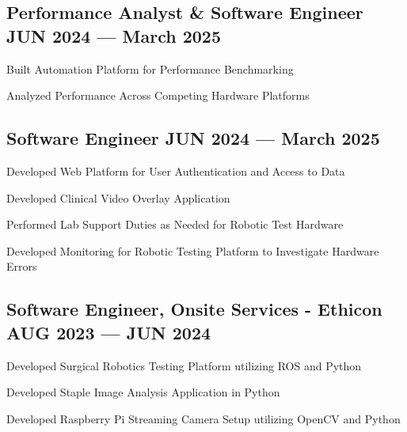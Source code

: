 \subsection{{Performance Analyst & Software Engineer \hfill JUN 2024 --- March 2025}}
\begin{zitemize}
\item Built Automation Platform for Performance Benchmarking
\item Analyzed Performance Across Competing Hardware Platforms
\end{zitemize}

\subsection{{Software Engineer \hfill JUN 2024 --- March 2025}}
\begin{zitemize}
\item Developed Web Platform for User Authentication and Access to Data
\item Developed Clinical Video Overlay Application
\item Performed Lab Support Duties as Needed for Robotic Test Hardware
\item Developed Monitoring for Robotic Testing Platform to Investigate Hardware Errors
\end{zitemize}

\subsection{{Software Engineer, Onsite Services - Ethicon \hfill AUG 2023 --- JUN 2024}}
\begin{zitemize}
\item Developed Surgical Robotics Testing Platform utilizing ROS and Python
\item Developed Staple Image Analysis Application in Python
\item Developed Raspberry Pi Streaming Camera Setup utilizing OpenCV and Python
\end{zitemize}

